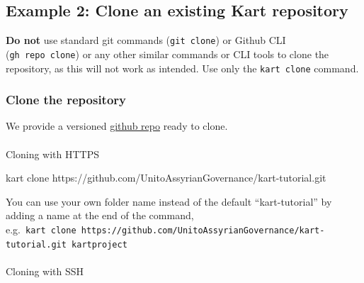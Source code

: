 \documentclass[
  letterpaper,
  DIV=11,
  numbers=noendperiod]{scrartcl}
\makeatletter
\let\oldparagraph\paragraph
\renewcommand{\paragraph}{
    \@ifstar
      \xxxParagraphStar
      \xxxParagraphNoStar
  }
\newcommand{\xxxParagraphStar}[1]{\oldparagraph*{#1}\mbox{}}
\newcommand{\xxxParagraphNoStar}[1]{\oldparagraph{#1}\mbox{}}
\newenvironment{Shaded}{\begin{snugshade}}{\end{snugshade}}
\newcommand{\ExtensionTok}[1]{\textcolor[rgb]{0.55,0.91,0.99}{#1}}
\newcommand{\NormalTok}[1]{\textcolor[rgb]{0.97,0.97,0.95}{#1}}
\makeatother
\begin{document}
\subsection{Example 2: Clone an existing Kart
repository}\label{sec-clone-repo}

\textbf{Do not} use standard git commands (\texttt{git\ clone}) or
Github CLI (\texttt{gh\ repo\ clone}) or any other similar commands or
CLI tools to clone the repository, as this will not work as intended.
Use only the \texttt{kart\ clone} command.

\subsubsection{Clone the repository}\label{sec-clone}

We provide a versioned
\href{https://github.com/UnitoAssyrianGovernance/kart-tutorial-dataset}{github
repo} ready to clone.

\paragraph{Cloning with HTTPS}\label{sec-clone-https}

\begin{Shaded}
\begin{Highlighting}[]
\ExtensionTok{kart}\NormalTok{ clone https://github.com/UnitoAssyrianGovernance/kart{-}tutorial.git}
\end{Highlighting}
\end{Shaded}

\begin{tcolorbox}[enhanced jigsaw, colframe=quarto-callout-tip-color-frame, colbacktitle=quarto-callout-tip-color!10!white, rightrule=.15mm, opacitybacktitle=0.6, opacityback=0, bottomrule=.15mm, coltitle=black, title=\textcolor{quarto-callout-tip-color}{\faLightbulb}\hspace{0.5em}{Tip}, left=2mm, bottomtitle=1mm, toptitle=1mm, toprule=.15mm, breakable, titlerule=0mm, colback=white, leftrule=.75mm, arc=.35mm]

You can use your own folder name instead of the default
``kart-tutorial'' by adding a name at the end of the command,
e.g.~\texttt{kart\ clone\ https://github.com/UnitoAssyrianGovernance/kart-tutorial.git\ kartproject}

\end{tcolorbox}

\paragraph{Cloning with SSH}\label{sec-clone-ssh}
\end{document}
